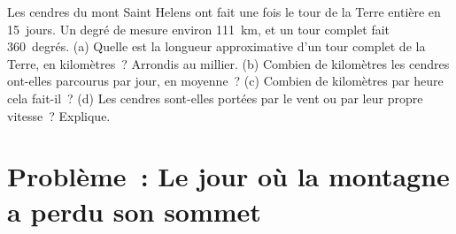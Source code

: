 \begin{exercise}[$\star\star\star$]\label{exo:g7:volcanoes:12}
Les cendres du mont Saint Helens ont fait une fois le tour de la Terre
entière en 15~jours. Un degré de  mesure environ \qty{111}{km}, et
un tour complet fait 360~degrés. (a) Quelle est la longueur approximative
d'un tour complet de la Terre, en kilomètres~? Arrondis au millier. (b)
Combien de kilomètres les cendres ont-elles parcourus par jour, en
moyenne~? (c) Combien de kilomètres par heure cela fait-il~? (d) Les
cendres sont-elles portées par le vent ou par leur propre vitesse~?
Explique.
\end{exercise}

\section{Problème~: Le jour où la montagne a perdu son sommet}

